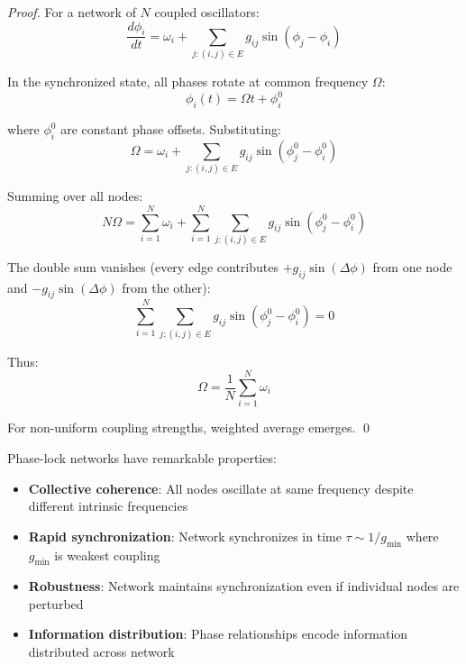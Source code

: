 \begin{proof}
For a network of $N$ coupled oscillators:
\begin{equation}
\frac{d\phi_i}{dt} = \omega_i + \sum_{j:(i,j) \in E} g_{ij} \sin(\phi_j - \phi_i)
\end{equation}

In the synchronized state, all phases rotate at common frequency $\Omega$:
\begin{equation}
\phi_i(t) = \Omega t + \phi_i^0
\end{equation}

where $\phi_i^0$ are constant phase offsets. Substituting:
\begin{equation}
\Omega = \omega_i + \sum_{j:(i,j) \in E} g_{ij} \sin(\phi_j^0 - \phi_i^0)
\end{equation}

Summing over all nodes:
\begin{equation}
N \Omega = \sum_{i=1}^{N} \omega_i + \sum_{i=1}^{N} \sum_{j:(i,j) \in E} g_{ij} \sin(\phi_j^0 - \phi_i^0)
\end{equation}

The double sum vanishes (every edge contributes $+g_{ij} \sin(\Delta\phi)$ from one node and $-g_{ij} \sin(\Delta\phi)$ from the other):
\begin{equation}
\sum_{i=1}^{N} \sum_{j:(i,j) \in E} g_{ij} \sin(\phi_j^0 - \phi_i^0) = 0
\end{equation}

Thus:
\begin{equation}
\Omega = \frac{1}{N} \sum_{i=1}^{N} \omega_i
\end{equation}

For non-uniform coupling strengths, weighted average emerges. \qed
\end{proof}

\begin{remark}
Phase-lock networks have remarkable properties:
\begin{itemize}
\item \textbf{Collective coherence}: All nodes oscillate at same frequency despite different intrinsic frequencies
\item \textbf{Rapid synchronization}: Network synchronizes in time $\tau \sim 1/g_{\text{min}}$ where $g_{\text{min}}$ is weakest coupling
\item \textbf{Robustness}: Network maintains synchronization even if individual nodes are perturbed
\item \textbf{Information distribution}: Phase relationships encode information distributed across network
\end{itemize}
\end{remark}

